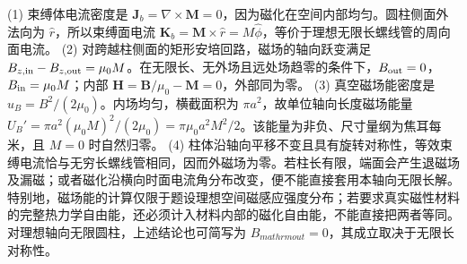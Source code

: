 (1) 束缚体电流密度是 \(\mathbf J_b=\nabla\times\mathbf M=0\)，因为磁化在空间内部均匀。圆柱侧面外法向为 \(\hat r\)，所以束缚面电流 \(\mathbf K_b=\mathbf M\times\hat r=M\hat\phi\)，等价于理想无限长螺线管的周向面电流。
(2) 对跨越柱侧面的矩形安培回路，磁场的轴向跃变满足 \(B_{z,\rm in}-B_{z,\rm out}=\mu_0M\)。在无限长、无外场且远处场趋零的条件下，\(B_{\rm out}=0\)，\(B_{\rm in}=\mu_0M\)；内部 \(\mathbf H=\mathbf B/\mu_0-\mathbf M=0\)，外部同为零。
(3) 真空磁场能密度是 \(u_B=B^2/(2\mu_0)\)。内场均匀，横截面积为 \(\pi a^2\)，故单位轴向长度磁场能量 \(U_B'=\pi a^2(\mu_0M)^2/(2\mu_0)=\pi\mu_0a^2M^2/2\)。该能量为非负、尺寸量纲为焦耳每米，且 \(M=0\) 时自然归零。
(4) 柱体沿轴向平移不变且具有旋转对称性，等效束缚电流恰与无穷长螺线管相同，因而外磁场为零。若柱长有限，端面会产生退磁场及漏磁；或者磁化沿横向时面电流角分布改变，便不能直接套用本轴向无限长解。 特别地，磁场能的计算仅限于题设理想空间磁感应强度分布；若要求真实磁性材料的完整热力学自由能，还必须计入材料内部的磁化自由能，不能直接把两者等同。 对理想轴向无限圆柱，上述结论也可简写为 \(B_{mathrm{out}}=0\)，其成立取决于无限长对称性。

